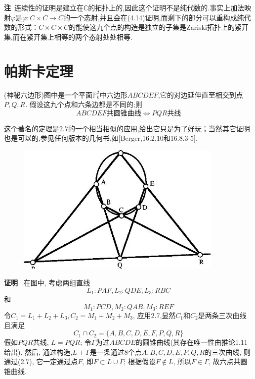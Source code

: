 \documentclass[UTF8]{book}
\begin{document}
		
		\textbf{注}\ 连续性的证明是建立在$ \mathbb{C} $的拓扑上的,因此这个证明不是纯代数的.事实上加法映射$ \varphi $是$\varphi: C \times C \rightarrow C$的一个态射,并且会在(4.14)证明,而剩下的部分可以重构成纯代数的形式：$ C \times C \times C $的能使这九个点的构造是独立的子集是Zariski拓扑上的紧开集,而在紧开集上相等的两个态射处处相等.
	\section{帕斯卡定理}
			(神秘六边形)图中是一个平面$\mathbb{P}^{2}_{k}$中六边形$ ABCDEF $,它的对边延伸直至相交到点$ P,Q,R $. 假设这九个点和六条边都是不同的;则
			\begin{equation*}
				ABCDEF\text{共圆锥曲线} \Longleftrightarrow PQR\text{共线}
			\end{equation*}
		
			这个著名的定理是2.7的一个相当相似的应用,给出它只是为了好玩；当然其它证明也是可以的,参见任何版本的几何书,如[Berger,16.2.10和16.8.3-5].
			\begin{figure}[h]
			  \centering
			  \includegraphics[width=10cm]{37.jpg}\\
			\end{figure}
		
		
			\textbf{证明} \ 在图中, 考虑两组直线
			\begin{equation*}
				L_{1}:PAF, L_{2}:QDE, L_{3}:RBC	
			\end{equation*}
			和
			\begin{equation*}
				M_{1}:PCD, M_{2}:QAB, M_{3}:REF	
			\end{equation*}
			令$C_{1}=L_{1}+L_{2}+L_{3},C_{2}=M_{1}+M_{2}+M_{3}$, 应用2.7,显然$C_{1}$和$C_{2}$是两条三次曲线且满足
			\begin{equation*}
			C_{1} \cap C_{2}=\{A,B,C,D,E,F,P,Q,R\}
			\end{equation*}
			假如$ PQR $共线, $ L=PQR $; 令$\Gamma$为过$ ABCDE $的圆锥曲线(其存在唯一性由推论1.11给出). 然后, 通过构造,$L+\Gamma$是一条通过8个点$ A,B,C,D,E,P,Q,R $的三次曲线, 则通过(2.7), 它一定通过点$ F $, 即$F \subset L \cup \Gamma$; 根据假设$F \notin L$, 所以$F \in \Gamma$, 故六点共圆锥曲线.
		
\end{document}
